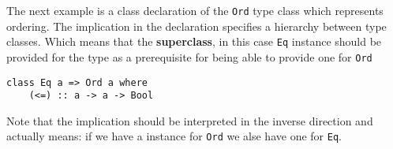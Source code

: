The next example is a class declaration of the \texttt{Ord} type class which
represents ordering. The implication in the declaration specifies a hierarchy
between type classes. Which means that the \textbf{superclass}, in this case
\texttt{Eq} instance should be provided for the type as a prerequisite for being
able to provide one for \texttt{Ord}
\begin{verbatim}
class Eq a => Ord a where
    (<=) :: a -> a -> Bool
\end{verbatim}
Note that the implication should be interpreted in the inverse direction and
actually means: if we have a instance for \texttt{Ord} we alse have one for
\texttt{Eq}.
